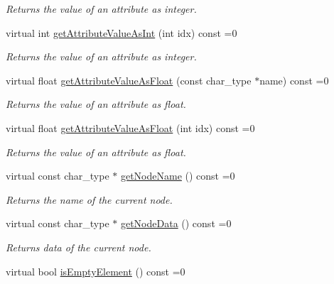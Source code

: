 \begin{DoxyCompactItemize}
\begin{DoxyCompactList}\small\item\em Returns the value of an attribute as integer. \end{DoxyCompactList}\item 
virtual int \hyperlink{classirr_1_1io_1_1_i_irr_x_m_l_reader_a8f2d57c9f358b9683fb177f440661426}{get\+Attribute\+Value\+As\+Int} (int idx) const =0
\begin{DoxyCompactList}\small\item\em Returns the value of an attribute as integer. \end{DoxyCompactList}\item 
virtual float \hyperlink{classirr_1_1io_1_1_i_irr_x_m_l_reader_a2b1032f213e9910827842f6057269235}{get\+Attribute\+Value\+As\+Float} (const char\+\_\+type $\ast$name) const =0
\begin{DoxyCompactList}\small\item\em Returns the value of an attribute as float. \end{DoxyCompactList}\item 
virtual float \hyperlink{classirr_1_1io_1_1_i_irr_x_m_l_reader_a3a01b3cec9db01d00928074846d39add}{get\+Attribute\+Value\+As\+Float} (int idx) const =0
\begin{DoxyCompactList}\small\item\em Returns the value of an attribute as float. \end{DoxyCompactList}\item 
virtual const char\+\_\+type $\ast$ \hyperlink{classirr_1_1io_1_1_i_irr_x_m_l_reader_a7d745b130c895d0f910f191d04e20e87}{get\+Node\+Name} () const =0
\begin{DoxyCompactList}\small\item\em Returns the name of the current node. \end{DoxyCompactList}\item 
virtual const char\+\_\+type $\ast$ \hyperlink{classirr_1_1io_1_1_i_irr_x_m_l_reader_aecbe0698e8f9acf88e27dd53da984210}{get\+Node\+Data} () const =0
\begin{DoxyCompactList}\small\item\em Returns data of the current node. \end{DoxyCompactList}\item 
\hypertarget{classirr_1_1io_1_1_i_irr_x_m_l_reader_a3c85b144e0376c9ff90bce1bbbc338a9}{virtual bool \hyperlink{classirr_1_1io_1_1_i_irr_x_m_l_reader_a3c85b144e0376c9ff90bce1bbbc338a9}{is\+Empty\+Element} () const =0}\label{classirr_1_1io_1_1_i_irr_x_m_l_reader_a3c85b144e0376c9ff90bce1bbbc338a9}


\end{DoxyCompactItemize}
